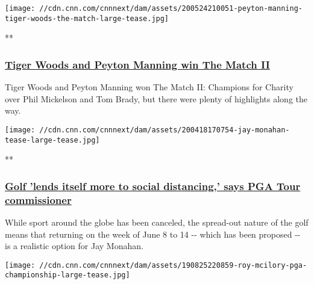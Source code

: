 \href{/videos/sports/2020/05/25/the-match-2-wrap-tiger-woods-peyton-manning-win-tom-brady-phil-mickelson-golf-spt-intl.cnn}{}

\texttt{[image: //cdn.cnn.com/cnnnext/dam/assets/200524210051-peyton-manning-tiger-woods-the-match-large-tease.jpg]}

**

\hypertarget{tiger-woods-and-peyton-manning-win-the-match-ii}{%
\subsubsection{\texorpdfstring{\href{/videos/sports/2020/05/25/the-match-2-wrap-tiger-woods-peyton-manning-win-tom-brady-phil-mickelson-golf-spt-intl.cnn}{Tiger
Woods and Peyton Manning win The Match
II}}{Tiger Woods and Peyton Manning win The Match II}}\label{tiger-woods-and-peyton-manning-win-the-match-ii}}

Tiger Woods and Peyton Manning won The Match II: Champions for Charity
over Phil Mickelson and Tom Brady, but there were plenty of highlights
along the way.

\href{/videos/sports/2020/04/18/jay-monahan-pga-commissioner-coronavirus-spt-intl.cnn}{}

\texttt{[image: //cdn.cnn.com/cnnnext/dam/assets/200418170754-jay-monahan-tease-large-tease.jpg]}

**

\hypertarget{golf-lends-itself-more-to-social-distancing-says-pga-tour-commissioner-1}{%
\subsubsection{\texorpdfstring{\href{/videos/sports/2020/04/18/jay-monahan-pga-commissioner-coronavirus-spt-intl.cnn}{Golf
'lends itself more to social distancing,' says PGA Tour
commissioner}}{Golf 'lends itself more to social distancing,' says PGA Tour commissioner}}\label{golf-lends-itself-more-to-social-distancing-says-pga-tour-commissioner-1}}

While sport around the globe has been canceled, the spread-out nature of
the golf means that returning on the week of June 8 to 14 -\/- which has
been proposed -\/- is a realistic option for Jay Monahan.

\href{/videos/sports/2019/08/26/rory-mcilroy-interview-tour-championship-2019-golf-pga-spt-intl.cnn}{}

\texttt{[image: //cdn.cnn.com/cnnnext/dam/assets/190825220859-roy-mcilory-pga-championship-large-tease.jpg]}

